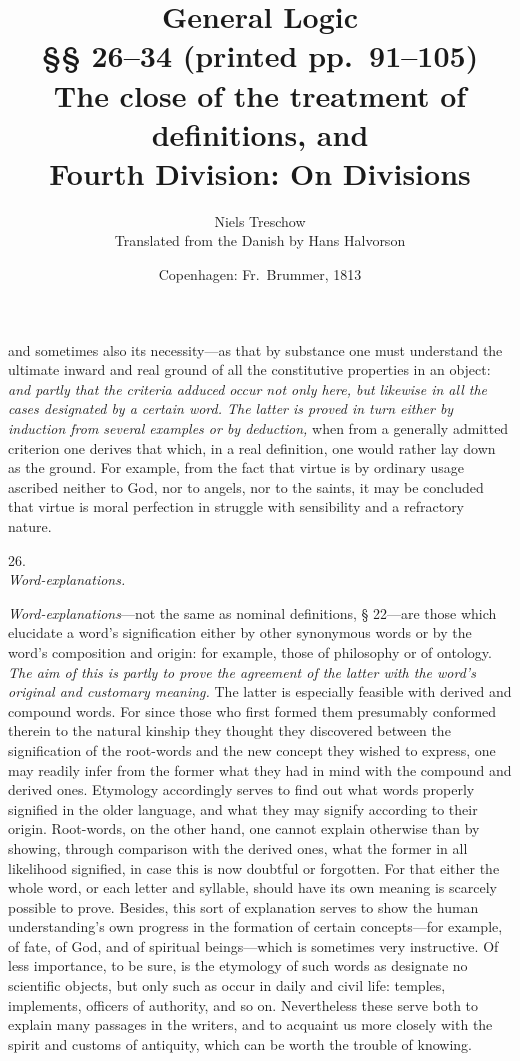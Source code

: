 \documentclass[12pt,a4paper]{article}
\title{\textbf{General Logic}\\[6pt]
  \large §§ 26--34 (printed pp.\ 91--105)\\[4pt]
  \normalsize The close of the treatment of definitions, and\\
  \large Fourth Division: On Divisions}
\author{Niels Treschow\\[4pt]
  \small Translated from the Danish by Hans Halvorson}
\date{\small Copenhagen: Fr.\ Brummer, 1813}
\newcommand{\logsec}[2]{%
  \bigskip\begin{center}{\large #1}\\[4pt]{\emph{#2}}\end{center}\smallskip}
\begin{document}
\maketitle
\thispagestyle{fancy}

\bigskip


\noindent
[\dots] and sometimes also its necessity---as that by substance one must
understand the ultimate inward and real ground of all the constitutive
properties in an object: \emph{and partly that the criteria adduced occur not
only here, but likewise in all the cases designated by a certain word. The
latter is proved in turn either by induction from several examples or by
deduction,} when from a generally admitted criterion one derives that which, in
a real definition, one would rather lay down as the ground. For example, from
the fact that virtue is by ordinary usage ascribed neither to God, nor to
angels, nor to the saints, it may be concluded that virtue is moral perfection
in struggle with sensibility and a refractory nature.

\logsec{26.}{Word-explanations.}

\noindent
\emph{Word-explanations}---not the same as nominal definitions, § 22---are those
which elucidate a word's signification either by other synonymous words or by
the word's composition and origin: for example, those of philosophy or of
ontology. \emph{The aim of this is partly to prove the agreement of the
latter with the word's original and customary meaning.}
The latter is especially feasible with derived and compound words. For since
those who first formed them presumably conformed therein to the natural
kinship
they thought they discovered between the signification of the root-words and the
new concept they wished to express, one may readily infer from the former what
they had in mind with the compound and derived ones. Etymology accordingly
serves to find out what words properly signified in the older language, and what
they may signify according to their origin. Root-words, on the other hand, one
cannot explain otherwise than by showing, through comparison with the derived
ones, what the former in all likelihood signified, in case this is now doubtful
or forgotten. For that either the whole word, or each letter and syllable,
should have its own meaning is scarcely possible to prove. Besides, this sort of
explanation serves to show the human understanding's own progress in the
formation of certain concepts---for example, of fate, of God, and of spiritual
beings---which is sometimes very instructive. Of less importance, to be sure, is
the etymology of such words as designate no scientific objects, but only such as
occur in daily and civil life: temples, implements, officers of authority, and
so on. Nevertheless these serve both to explain many passages in the writers,
and to acquaint us more closely with the spirit and customs of antiquity, which
can be worth the trouble of knowing.
\end{document}
